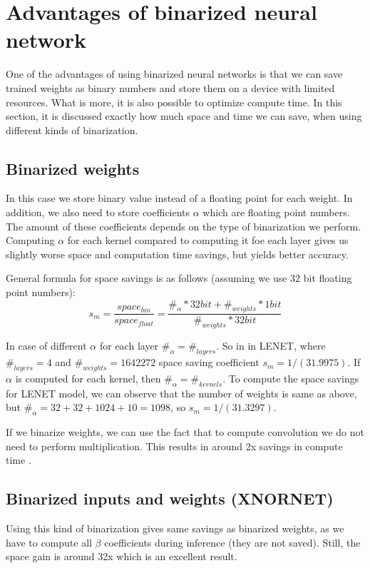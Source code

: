 \documentclass[licencjacka]{pracamgr}
\begin{document}
	\chapter{Advantages of binarized neural network}
    One of the advantages of using binarized neural networks is that we can save trained weights as binary numbers and store them on a device with limited resources. What is more, it is also possible to optimize compute time. In this section, it is discussed exactly how much space and time we can save, when using different kinds of binarization.
    
    \section{Binarized weights}
        In this case we store binary value instead of a floating point for each weight. In addition, we also need to store coefficients $\alpha$ which are floating point numbers. The amount of these coefficients depends on the type of binarization we perform. Computing $\alpha$ for each kernel compared to computing it foe each layer gives us slightly worse space and computation time savings, but yields better accuracy.
        
        General formula for space savings is as follows (assuming we use 32 bit floating point numbers):
        $$s_m =  \frac{space_{bin}}{space_{float}} = \frac{\#_\alpha * 32bit + \#_{weights}*1bit}{\#_{weights} * 32bit} $$
        
        In case of different $\alpha$ for each layer $\#_\alpha = \#_{layers}$. So in in LENET, where $\#_{layers} = 4$ and $\#_{weights} = 1642272$ space saving coefficient $s_m = 1/(31.9975)$. If $\alpha$ is computed for each kernel, then $\#_\alpha = \#_{kernels}$. To compute the space savings for LENET model, we can observe that the number of weights is same as above, but $\#_\alpha = 32+32+1024+10 = 1098$, so $s_m = 1/(31.3297)$.
            
	    If we binarize weights, we can use the fact that to compute convolution we do not need to perform multiplication. This results in around 2x savings in compute time \cite{xornet}.
	    
	    \section{Binarized inputs and weights (XNORNET)}
	    Using this kind of binarization gives same savings as binarized weights, as we have to compute all $\beta$ coefficients during inference (they are not saved). Still, the space gain is around 32x which is an excellent result.
	    
\end{document}
